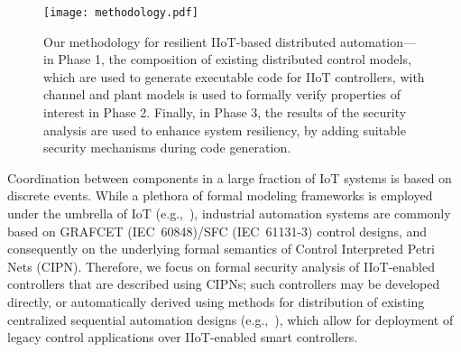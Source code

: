 
%
\begin{figure}[t]
	\centering
	\texttt{[image: methodology.pdf]}
	\caption{Our methodology for resilient IIoT-based distributed automation---in Phase 1, the composition of existing distributed control models, which are used to generate executable code for IIoT controllers, with channel and plant models is used to formally verify properties of interest in Phase 2. Finally, in Phase 3, the results of the security analysis are used to enhance system resiliency, by adding suitable  security mechanisms during code generation.}
	\label{fig:methodology}
\end{figure}


Coordination between components in a large fraction of IoT systems is based on discrete events. While a plethora of formal modeling frameworks is employed under the umbrella of IoT (e.g.,~\cite{iotsat,iotz3,iotautomata}), industrial automation systems are commonly based on GRAFCET (IEC~60848)/SFC (IEC~61131-3) control designs, and consequently on the underlying formal semantics of Control Interpreted Petri Nets (CIPN). Therefore, we focus on formal security analysis of IIoT-enabled controllers that are described using CIPNs; such controllers may be  developed directly, or automatically derived using methods for distribution of existing centralized sequential automation designs (e.g.,~\cite{jakovljevic_tcst19}), which allow for deployment of legacy control applications over IIoT-enabled smart controllers.


